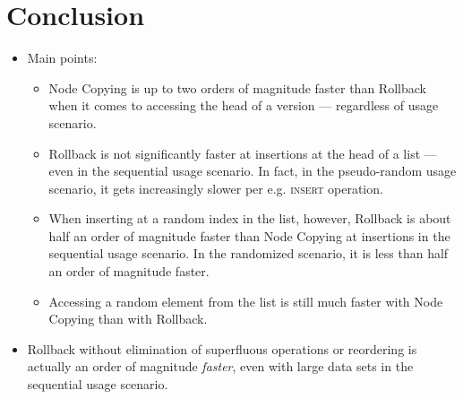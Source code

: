 \chapter{Conclusion}

\begin{itemize}

  \item Main points:

  \begin{itemize}

    \item Node Copying is up to two orders of magnitude faster than Rollback
    when it comes to accessing the head of a version --- regardless of usage
    scenario.

    \item Rollback is not significantly faster at insertions at the head of a
    list --- even in the sequential usage scenario. In fact, in the
    pseudo-random usage scenario, it gets increasingly slower per e.g.
    \textsc{insert} operation.

    \item When inserting at a random index in the list, however, Rollback is
    about half an order of magnitude faster than Node Copying at insertions in
    the sequential usage scenario. In the randomized scenario, it is less than
    half an order of magnitude faster.

    \item Accessing a random element from the list is still much faster with
    Node Copying than with Rollback.

  \end{itemize}

  \item Rollback without elimination of superfluous operations or reordering is
  actually an order of magnitude \emph{faster}, even with large data sets in the
  sequential usage scenario.

\end{itemize}


